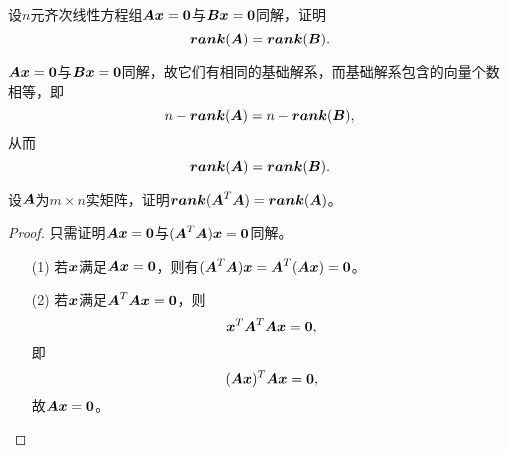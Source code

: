 \begin{frame}

\begin{li}
  设$n$元齐次线性方程组$\MA\vx=\M0$与$\MB\vx=\M0$同解，证明
  $$
  \boldsymbol{rank}(\boldsymbol{A})=\boldsymbol{rank}(\boldsymbol{B}).
  $$
\end{li}
\pause 
\begin{jie}
$\MA\vx=\M0$与$\MB\vx=\M0$同解，故它们有相同的基础解系，而基础解系包含的向量个数相等，即
$$
n-\boldsymbol{rank}(\boldsymbol{A})=n-\boldsymbol{rank}(\boldsymbol{B}),
$$
从而
$$
\boldsymbol{rank}(\boldsymbol{A})=\boldsymbol{rank}(\boldsymbol{B}).
$$
\end{jie}
\end{frame}


\begin{frame}
\begin{li}
  设$\boldsymbol{A}$为$m\times n$实矩阵，证明$\boldsymbol{rank}(\boldsymbol{A}^T\boldsymbol{A})=\boldsymbol{rank}(\boldsymbol{A})$。    
\end{li}
\pause 
\begin{proof}
只需证明$\MA\vx=\M0$与$(\MA^T\MA)\vx=\M0$同解。
\begin{itemize}
\item[(1)] 若${\boldsymbol{x}}$满足$\MA\vx=\M0$，则有$(\MA^T\MA)\vx=\MA^T(\MA\vx)=\M0$。 
\item[(2)] 若${\boldsymbol{x}}$满足$\MA^T\MA\vx=\M0$，则
  $$
  \vx^T\MA^T\MA\vx=\M0,
  $$
  即
  $$
  (\MA\vx)^T\MA\vx=\M0,
  $$
  故$\MA\vx=\M0$。
\end{itemize}
\end{proof}
\end{frame}

